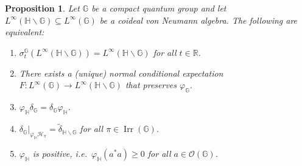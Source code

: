 \documentclass[reqno]{amsart}
\numberwithin{equation}{section}
\newtheorem{Prop}[Theorem]{Proposition}
\DeclareMathOperator{\Irr}{\mathrm{Irr}}
\renewcommand{\H}{\mathbb{H}}
\newcommand{\mcH}{\mathcal{H}}
\newcommand{\mcO}{\mathcal{O}}
\newcommand{\G}{\mathbb{G}}
\newcommand{\R}{\mathbb{R}}
\begin{document}
\begin{Prop}\label{compact quasi-subgroup} Let $\G$ be a compact quantum group and let $L^\infty(\H\backslash \G)\subseteq L^\infty(\G)$ be a coideal von Neumann algebra. The following are equivalent:
    \begin{enumerate}
    \item\vspace{-1.5mm} $\sigma_t^\G(L^\infty(\H\backslash \G))= L^\infty(\H\backslash \G)$ for all $t\in \R$.
    \item\vspace{-1.5mm} There exists a (unique) normal conditional expectation $F: L^\infty(\G)\to L^\infty(\H\backslash \G)$ that preserves $\varphi_\G$.
    \item\vspace{-1.5mm} $\varphi_\H \delta_\G = \delta_\G \varphi_\H$.
 \item\vspace{-1.5mm} $\delta_\G\vert_{\varphi_\H \mcH_\pi} = \tilde{\delta}_{\H\backslash \G}$ for all $\pi \in \Irr(\G)$.
    \item\vspace{-1.5mm} $\varphi_\H$ is positive, i.e.\ $\varphi_\H(a^*a)\ge 0$ for all $a\in \mcO(\G)$.
\end{enumerate}
\end{Prop}
\end{document}
